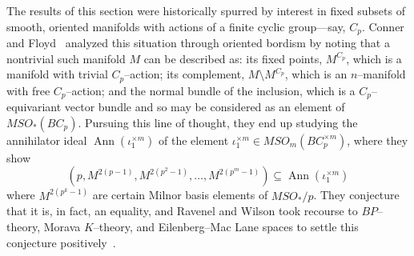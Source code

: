 \begin{remark}
The results of this section were historically spurred by interest in fixed subsets of smooth, oriented manifolds with actions of a finite cyclic group---say, \(C_p\).  Conner and Floyd~\cite{ConnerFloydBook} analyzed this situation through oriented bordism by noting that a nontrivial such manifold \(M\) can be described as: its fixed points, \(M^{C_p}\), which is a manifold with trivial \(C_p\)--action; its complement, \(M \setminus M^{C_p}\), which is an \(n\)--manifold with free \(C_p\)--action; and the normal bundle of the inclusion, which is a \(C_p\)--equivariant vector bundle and so may be considered as an element of \(MSO_*(BC_p)\).  Pursuing this line of thought, they end up studying the annihilator ideal $\operatorname{Ann}(\iota_1^{\times m})$ of the element $\iota_1^{\times m} \in MSO_m(BC_p^{\times m})$, where they show \[(p, M^{2(p-1)}, M^{2(p^2-1)}, \ldots, M^{2(p^m-1)}) \subseteq \operatorname{Ann}(\iota_1^{\times m})\] where $M^{2(p^k-1)}$ are certain Milnor basis elements of $MSO_* / p $.  They conjecture that it is, in fact, an equality, and Ravenel and Wilson took recourse to \(BP\)--theory, Morava \(K\)--theory, and Eilenberg--Mac Lane spaces to settle this conjecture positively~\cite[Section 10]{RavenelWilsonKthyOfEMSpaces}.
\end{remark}










